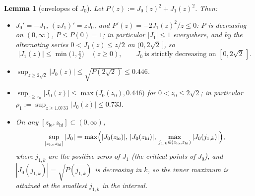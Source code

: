 \documentclass[11pt]{article}
\newtheorem{lemma}{Lemma}
\begin{document}
\begin{lemma}[envelopes of $J_0$]\label{lem:J0env}
Let $P(z):=J_0(z)^2+J_1(z)^2$. Then:
\begin{itemize}
\item[(i)] $J_0'=-J_1$, $(zJ_1)'=zJ_0$, and $P'(z)=-2J_1(z)^2/z\le0$:
$P$ is decreasing on $(0,\infty)$, $P\le P(0)=1$; in particular
$|J_1|\le1$ everywhere, and by the alternating series
$0<J_1(z)\le z/2$ on $(0,2\sqrt2\,]$, so
\[
|J_1(z)|\le\min\bigl(1,\tfrac z2\bigr)\quad(z\ge0),
\qquad
J_0\ \text{is strictly decreasing on }[0,2\sqrt2\,].
\]
\item[(ii)] $\sup_{z\ge2\sqrt2}|J_0(z)|\le\sqrt{P(2\sqrt2)}\le0.446$.
\item[(iii)] $\sup_{z\ge z_0}|J_0(z)|\le\max\bigl(J_0(z_0),0.446\bigr)$
for $0<z_0\le2\sqrt2$; in particular
$\displaystyle\rho_1:=\sup_{z\ge1.0733}|J_0(z)|\le0.733$.
\item[(iv)] On any $[z_{\mathrm{lo}},z_{\mathrm{hi}}]\subset(0,\infty)$,
\[
\sup_{[z_{\mathrm{lo}},z_{\mathrm{hi}}]}|J_0|
=\max\Bigl(|J_0(z_{\mathrm{lo}})|,\,|J_0(z_{\mathrm{hi}})|,\,
\max_{j_{1,k}\in(z_{\mathrm{lo}},z_{\mathrm{hi}})}|J_0(j_{1,k})|\Bigr),
\]
where $j_{1,k}$ are the positive zeros of $J_1$ (the critical points
of $J_0$), and $|J_0(j_{1,k})|=\sqrt{P(j_{1,k})}$ is decreasing in
$k$, so the inner maximum is attained at the smallest $j_{1,k}$ in the
interval.
\end{itemize}
\end{lemma}
\end{document}
